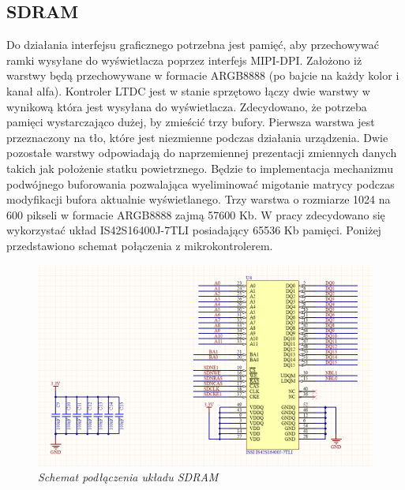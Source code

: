 \documentclass[eng,printmode]{mgr}
\begin{document}
\subsection*{SDRAM}
Do działania interfejsu graficznego potrzebna jest pamięć, aby przechowywać ramki wysyłane do wyświetlacza poprzez interfejs MIPI-DPI. Założono iż warstwy będą przechowywane w formacie ARGB8888 (po bajcie na każdy kolor i kanał alfa). Kontroler LTDC jest w stanie sprzętowo łączy dwie warstwy w wynikową która jest wysyłana do wyświetlacza. Zdecydowano, że potrzeba pamięci wystarczająco dużej, by zmieścić trzy bufory. Pierwsza warstwa jest przeznaczony na tło, które jest niezmienne podczas działania urządzenia. Dwie pozostałe warstwy odpowiadają do naprzemiennej prezentacji zmiennych danych takich jak położenie statku powietrznego. Będzie to implementacja mechanizmu podwójnego buforowania pozwalająca wyeliminować migotanie matrycy podczas modyfikacji bufora aktualnie wyświetlanego. Trzy warstwa o rozmiarze 1024 na 600 pikseli w formacie ARGB8888 zajmą 57600 Kb. W pracy zdecydowano się wykorzystać układ IS42S16400J-7TLI posiadający 65536 Kb pamięci. Poniżej przedstawiono schemat połączenia z mikrokontrolerem.

\begin{figure}[!h]
    \centering
    \includegraphics[width=\textwidth]{schematics/sdram.png}
    \caption{\textit{Schemat podłączenia układu SDRAM}}
\end{figure}
\end{document}

